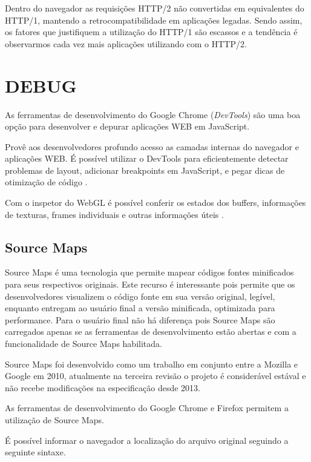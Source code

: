 Dentro do navegador as requisições HTTP/2 não convertidas em
equivalentes do HTTP/1, mantendo a retrocompatibilidade em aplicações
legadas. Sendo assim, os fatores que justifiquem a utilização do HTTP/1
são escassos e a tendência é observarmos cada vez mais aplicações
utilizando com o HTTP/2.

\section{DEBUG}
\begin{draft}

As ferramentas de desenvolvimento do  Google Chrome (\textit{DevTools}) são uma boa opção para desenvolver e depurar aplicações WEB em JavaScript. 

Provê aos desenvolvedores profundo acesso as camadas internas do navegador e aplicações WEB. É possível utilizar  o  DevTools para eficientemente detectar 
problemas de layout, adicionar breakpoints em JavaScript, e pegar dicas de otimização de código \autocite{chromeDevTools}.


Com o inspetor do WebGL é possível conferir os estados dos buffers, informações de texturas, frames individuais e outras informações úteis \autocite{html5mostwanted}.
\end{draft}

\subsection{Source Maps}

Source Maps é uma tecnologia que permite mapear códigos fontes
minificados para seus respectivos originais. Este recurso é
interessante pois permite que os desenvolvedores visualizem o código
fonte em sua versão original, legível, enquanto entregam ao usuário
final a versão minificada, optimizada para performance.
Para o usuário final não há diferença pois Source Maps são
carregados apenas se as ferramentas de desenvolvimento estão abertas e
com a funcionalidade de Source Maps habilitada.

Source Maps foi desenvolvido como um trabalho em conjunto entre a
Mozilla e Google em 2010, atualmente na terceira revisão o projeto é
considerável estával e não recebe modificações na especificação
desde 2013.

As ferramentas de desenvolvimento do Google Chrome e Firefox permitem a
utilização de Source Maps.

É possível informar o navegador a localização do arquivo original
seguindo a seguinte sintaxe.

